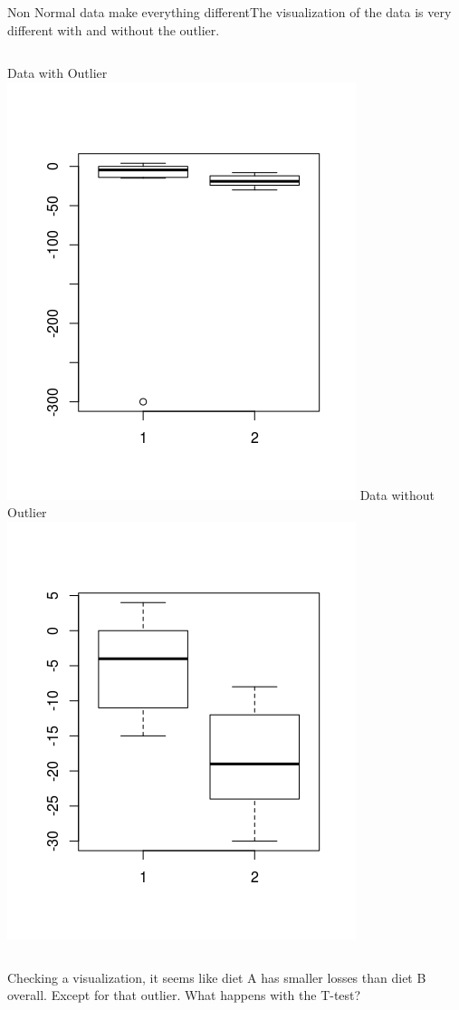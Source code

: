 \begin{frame}{Non Normal data make everything different}{The visualization of the data is very different with and without the outlier.}
  \begin{columns}
    Data with Outlier\\
    \includegraphics[width=.8\textwidth]{../img/diet_outlier1}
    Data without Outlier\\
    \includegraphics[width=.8\textwidth]{../img/diet_outlier2}
  \end{columns}\bigskip

  Checking a visualization, it seems like diet A has smaller losses than diet B
  overall. Except for that outlier. What happens with the T-test?
\end{frame}

